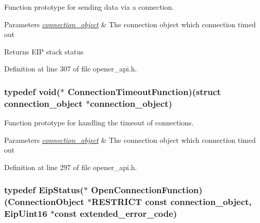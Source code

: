 \-Function prototype for sending data via a connection. 


\begin{DoxyParams}{\-Parameters}
{\em \hyperlink{structconnection__object}{connection\-\_\-object}} & \-The connection object which connection timed out\\
\hline
\end{DoxyParams}
\begin{DoxyReturn}{\-Returns}
\-E\-I\-P stack status 
\end{DoxyReturn}


\-Definition at line 307 of file opener\-\_\-api.\-h.

\hypertarget{group__CIP__API_gaffa28b7ae343af7c7d1c7c52d83bbbee}{
\subsubsection[{\-Connection\-Timeout\-Function}]{\setlength{\rightskip}{0pt plus 5cm}typedef void($\ast$ {\bf \-Connection\-Timeout\-Function})(struct {\bf connection\-\_\-object} $\ast${\bf connection\-\_\-object})}}\label{d2/dc9/group__CIP__API_gaffa28b7ae343af7c7d1c7c52d83bbbee}


\-Function prototype for handling the timeout of connections. 


\begin{DoxyParams}{\-Parameters}
{\em \hyperlink{structconnection__object}{connection\-\_\-object}} & \-The connection object which connection timed out \\
\hline
\end{DoxyParams}


\-Definition at line 297 of file opener\-\_\-api.\-h.

\hypertarget{group__CIP__API_gaba609aaaca108b8d1b24da1ccbd7b375}{
\subsubsection[{\-Open\-Connection\-Function}]{\setlength{\rightskip}{0pt plus 5cm}typedef {\bf \-Eip\-Status}($\ast$ {\bf \-Open\-Connection\-Function})({\bf \-Connection\-Object} $\ast$\-R\-E\-S\-T\-R\-I\-C\-T const {\bf connection\-\_\-object}, {\bf \-Eip\-Uint16} $\ast$const extended\-\_\-error\-\_\-code)}}\label{d2/dc9/group__CIP__API_gaba609aaaca108b8d1b24da1ccbd7b375}


